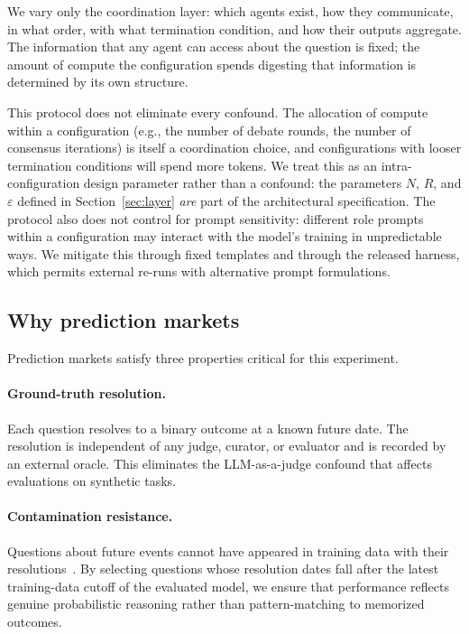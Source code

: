 \documentclass[11pt]{article}
\begin{document}
We vary only the coordination layer: which agents exist, how they communicate, in what order, with what termination condition, and how their outputs aggregate. The information that any agent can access about the question is fixed; the amount of compute the configuration spends digesting that information is determined by its own structure.

This protocol does not eliminate every confound. The allocation of compute within a configuration (e.g., the number of debate rounds, the number of consensus iterations) is itself a coordination choice, and configurations with looser termination conditions will spend more tokens. We treat this as an intra-configuration design parameter rather than a confound: the parameters $N$, $R$, and $\varepsilon$ defined in Section~\ref{sec:layer} \emph{are} part of the architectural specification. The protocol also does not control for prompt sensitivity: different role prompts within a configuration may interact with the model's training in unpredictable ways. We mitigate this through fixed templates and through the released harness, which permits external re-runs with alternative prompt formulations.

\subsection{Why prediction markets}
\label{sec:method-pm}

Prediction markets satisfy three properties critical for this experiment.

\paragraph{Ground-truth resolution.}
Each question resolves to a binary outcome at a known future date. The resolution is independent of any judge, curator, or evaluator and is recorded by an external oracle. This eliminates the LLM-as-a-judge confound that affects evaluations on synthetic tasks.

\paragraph{Contamination resistance.}
Questions about future events cannot have appeared in training data with their resolutions~\citep{jimenez2024swebench}. By selecting questions whose resolution dates fall after the latest training-data cutoff of the evaluated model, we ensure that performance reflects genuine probabilistic reasoning rather than pattern-matching to memorized outcomes.
\end{document}
